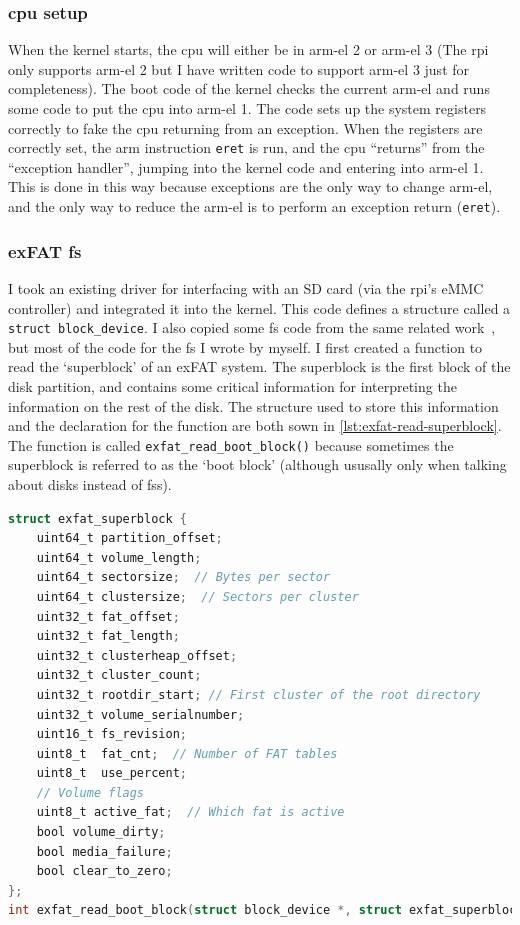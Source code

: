 \documentclass{article}
\begin{document}
\subsubsection{\texorpdfstring{\gls{cpu}}{CPU} setup}
\label{sec:impl_cpu_setup}
When the kernel starts, the \gls{cpu} will either be in \gls{arm-el} 2 or
\gls{arm-el} 3 (The \gls{rpi} only supports \gls{arm-el} 2 but I have written
code to support \gls{arm-el} 3 just for completeness). The boot code of the
kernel checks the current \gls{arm-el} and runs some code to put the \gls{cpu}
into \gls{arm-el} 1. The code sets up the system registers correctly to fake
the \gls{cpu} returning from an exception. When the registers are correctly
set, the \gls{arm} instruction \texttt{eret} is run, and the \gls{cpu}
``returns'' from the ``exception handler'', jumping into the kernel code and
entering into \gls{arm-el} 1. This is done in this way because exceptions are
the only way to change \gls{arm-el}, and the only way to reduce the
\gls{arm-el} is to perform an exception return (\texttt{eret}).

\subsubsection{exFAT \texorpdfstring{\gls{fs}}{Filesystem}}
\label{sec:impl_fs}
I took an existing driver for interfacing with an SD card (via the \gls{rpi}'s
eMMC controller) and integrated it into the kernel. This code defines a
structure called a \verb!struct block_device!. I also copied some \gls{fs} code
from the same related work~\cite{rpi-boot-gh}, but most of the code for the
\gls{fs} I wrote by myself. I first created a function to read the `superblock'
of an exFAT system. The superblock is the first block of the disk partition,
and contains some critical information for interpreting the information on the
rest of the disk. The structure used to store this information and the
declaration for the function are both sown in
\autoref{lst:exfat-read-superblock}. The function is called
\verb!exfat_read_boot_block()! because sometimes the superblock is referred to
as the `boot block' (although ususally only when talking about disks instead of
\glspl{fs}).

\begin{lstlisting}[language=C,
                   caption={The structure used to represent the exFAT
                   superblock information, and the declaration of the function
                   used to read it.},
                   label={lst:exfat-read-superblock}]
struct exfat_superblock {
    uint64_t partition_offset;
    uint64_t volume_length;
    uint64_t sectorsize;  // Bytes per sector
    uint64_t clustersize;  // Sectors per cluster
    uint32_t fat_offset;
    uint32_t fat_length;
    uint32_t clusterheap_offset;
    uint32_t cluster_count;
    uint32_t rootdir_start; // First cluster of the root directory
    uint32_t volume_serialnumber;
    uint16_t fs_revision;
    uint8_t  fat_cnt;  // Number of FAT tables
    uint8_t  use_percent;
    // Volume flags
    uint8_t active_fat;  // Which fat is active
    bool volume_dirty;
    bool media_failure;
    bool clear_to_zero;
};
int exfat_read_boot_block(struct block_device *, struct exfat_superblock *);
\end{lstlisting}
\end{document}
